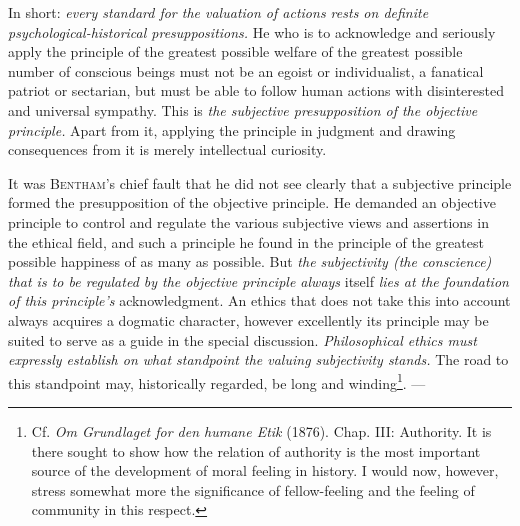 \documentclass[12pt,a4paper,openany]{book}
\newcommand{\opage}[1]{\marginnote{\footnotesize\textit{[#1]}}}
\begin{document}
\opage{49}In short: \textit{every standard for the valuation of actions rests on definite
psychological-historical presuppositions.} He who is to acknowledge and seriously apply the
principle of the greatest possible welfare of the greatest possible number of conscious beings must
not be an egoist or individualist, a fanatical patriot or sectarian, but must be able to follow human
actions with disinterested and universal sympathy. This is \textit{the subjective presupposition of
the objective principle.} Apart from it, applying the principle in judgment and drawing consequences
from it is merely intellectual curiosity.

It was \textsc{Bentham}'s chief fault that he did not see clearly that a subjective principle formed
the presupposition of the objective principle. He demanded an objective principle to control and
regulate the various subjective views and assertions in the ethical field, and such a principle he
found in the principle of the greatest possible happiness of as many as possible. But \textit{the
subjectivity (the conscience) that is to be regulated by the objective principle always} itself
\textit{lies at the foundation of this principle's} acknowledgment. An ethics that does not take this
into account always acquires a dogmatic character, however excellently its principle may be suited
to serve as a guide in the special discussion. \textit{Philosophical ethics must expressly establish
on what standpoint the valuing subjectivity stands.} The road to this standpoint may, historically
regarded, be long and winding\footnote[1]{Cf. \textit{Om Grundlaget for den humane Etik} (1876).
Chap. III: Authority. It is there sought to show how the relation of authority is the most important
source of the development of moral feeling in history. I would now, however, stress somewhat more the
significance of fellow-feeling and the feeling of community in this respect.}. ---
\end{document}
